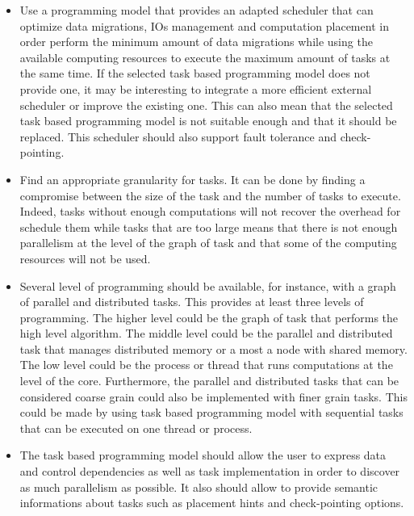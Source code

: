 \begin{itemize}
	\item Use a programming model that provides an adapted scheduler that can optimize data migrations, IOs management and computation placement in order perform the minimum amount of data migrations while using the available computing resources to execute the maximum amount of tasks at the same time.
	If the selected task based programming model does not provide one, it may be interesting to integrate a more efficient external scheduler or improve the existing one.
	This can also mean that the selected task based programming model is not suitable enough and that it should be replaced.
	This scheduler should also support fault tolerance and check-pointing.
	\item Find an appropriate granularity for tasks.
	It can be done by finding a compromise between the size of the task and the number of tasks to execute.
	Indeed, tasks without enough computations will not recover the overhead for schedule them while tasks that are too large means that there is not enough parallelism at the level of the graph of task and that some of the computing resources will not be used.
	\item Several level of programming should be available, for instance, with a graph of parallel and distributed tasks.
	This provides at least three levels of programming.
	The higher level could be the graph of task that performs the high level algorithm.
	The middle level could be the parallel and distributed task that manages distributed memory or a most a node with shared memory.
	The low level could be the process or thread that runs computations at the level of the core.
	Furthermore, the parallel and distributed tasks that can be considered coarse grain could also be implemented with finer grain tasks.
	This could be made by using task based programming model with sequential tasks that can be executed on one thread or process.
	\item The task based programming model should allow the user to express data and control dependencies as well as task implementation in order to discover as much parallelism as possible.
	It also should allow to provide semantic informations about tasks such as placement hints and check-pointing options.
\end{itemize}

